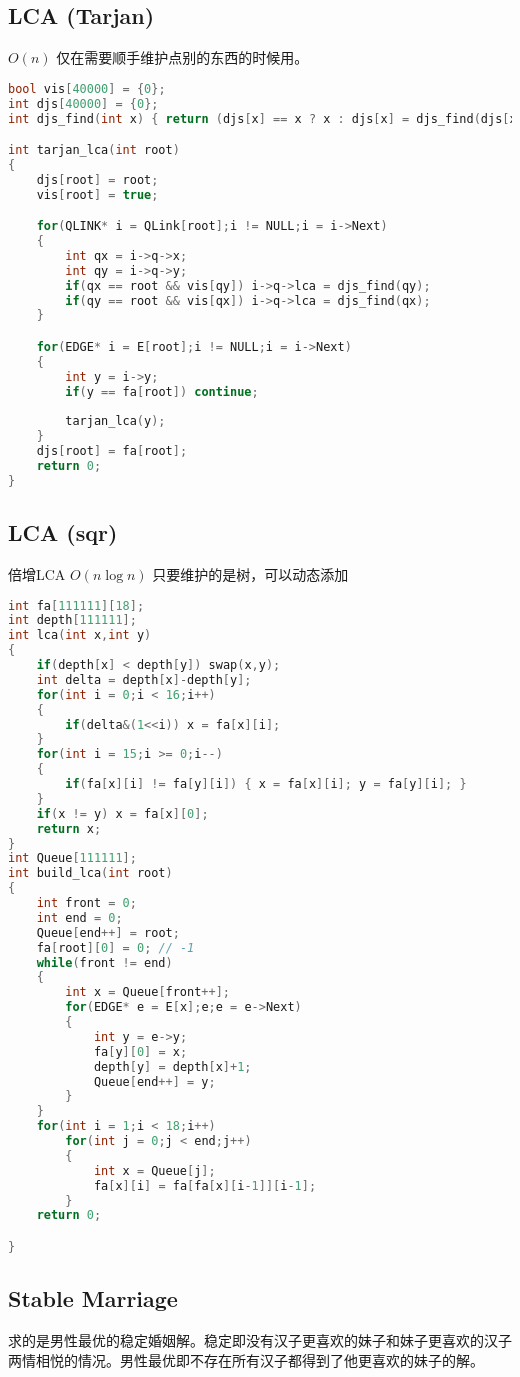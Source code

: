 \subsection{LCA (Tarjan)}
$O(n)$ 仅在需要顺手维护点别的东西的时候用。
\begin{lstlisting}[language=C++]
bool vis[40000] = {0};
int djs[40000] = {0};
int djs_find(int x) { return (djs[x] == x ? x : djs[x] = djs_find(djs[x])); }

int tarjan_lca(int root)
{
	djs[root] = root;
	vis[root] = true;

	for(QLINK* i = QLink[root];i != NULL;i = i->Next)
	{
		int qx = i->q->x;
		int qy = i->q->y;
		if(qx == root && vis[qy]) i->q->lca = djs_find(qy);
		if(qy == root && vis[qx]) i->q->lca = djs_find(qx);
	}

	for(EDGE* i = E[root];i != NULL;i = i->Next)
	{
		int y = i->y;
		if(y == fa[root]) continue;
		
		tarjan_lca(y);
	}
	djs[root] = fa[root];
	return 0;
}
\end{lstlisting}
\subsection{LCA (sqr)}
 倍增LCA $O(n\log n)$ 只要维护的是树，可以动态添加 
\begin{lstlisting}[language=C++]
int fa[111111][18];
int depth[111111];
int lca(int x,int y)
{
	if(depth[x] < depth[y]) swap(x,y);
	int delta = depth[x]-depth[y];
	for(int i = 0;i < 16;i++)
	{
		if(delta&(1<<i)) x = fa[x][i];
	}
	for(int i = 15;i >= 0;i--)
	{
		if(fa[x][i] != fa[y][i]) { x = fa[x][i]; y = fa[y][i]; }
	}
	if(x != y) x = fa[x][0];
	return x;
}
int Queue[111111];
int build_lca(int root)
{
	int front = 0;
	int end = 0;
	Queue[end++] = root;
	fa[root][0] = 0; // -1 
	while(front != end)
	{
		int x = Queue[front++];
		for(EDGE* e = E[x];e;e = e->Next)
		{
			int y = e->y;
			fa[y][0] = x;
			depth[y] = depth[x]+1;
			Queue[end++] = y;	
		}
	}
	for(int i = 1;i < 18;i++)
		for(int j = 0;j < end;j++)
		{
			int x = Queue[j];
			fa[x][i] = fa[fa[x][i-1]][i-1];
		}
	return 0;

}
\end{lstlisting}
\subsection{Stable Marriage}

求的是男性最优的稳定婚姻解。稳定即没有汉子更喜欢的妹子和妹子更喜欢的汉子两情相悦的情况。男性最优即不存在所有汉子都得到了他更喜欢的妹子的解。

